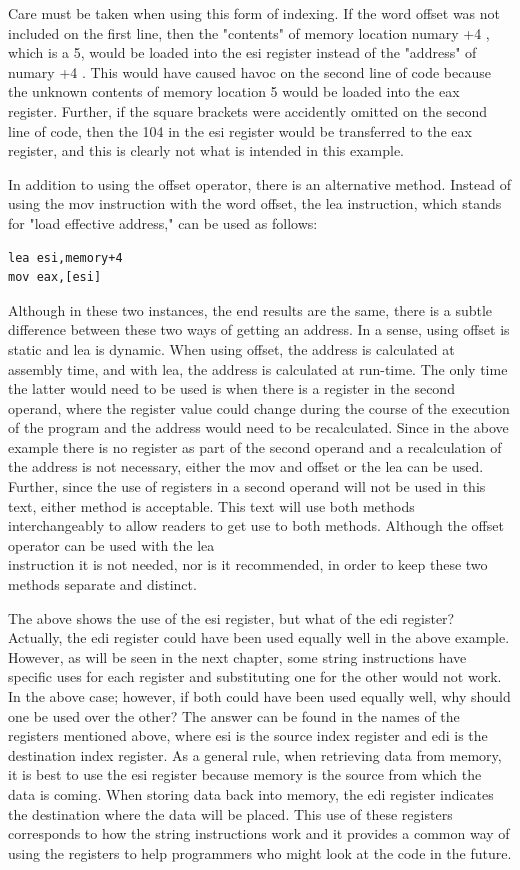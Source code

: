 \documentclass[10pt]{book}
\begin{document}
Care must be taken when using this form of indexing. If the word offset was not included on the first line, then the "contents" of memory location numary +4 , which is a 5, would be loaded into the esi register instead of the "address" of numary +4 . This would have caused havoc on the second line of code because the unknown contents of memory location 5 would be loaded into the eax register. Further, if the square brackets were accidently omitted on the second line of code, then the 104 in the esi register would be transferred to the eax register, and this is clearly not what is intended in this example.

In addition to using the offset operator, there is an alternative method. Instead of using the mov instruction with the word offset, the lea instruction, which stands for "load effective address," can be used as follows:

\begin{verbatim}
lea esi,memory+4
mov eax,[esi]
\end{verbatim}

Although in these two instances, the end results are the same, there is a subtle difference between these two ways of getting an address. In a sense, using offset is static and lea is dynamic. When using offset, the address is calculated at assembly time, and with lea, the address is calculated at run-time. The only time the latter would need to be used is when there is a register in the second operand, where the register value could change during the course of the execution of the program and the address would need to be recalculated. Since in the above example there is no register as part of the second operand and a recalculation of the address is not necessary, either the mov and offset or the lea can be used. Further, since the use of registers in a second operand will not be used in this text, either method is acceptable. This text will use both methods interchangeably to allow readers to get use to both methods. Although the offset operator can be used with the lea\\
instruction it is not needed, nor is it recommended, in order to keep these two methods separate and distinct.

The above shows the use of the esi register, but what of the edi register? Actually, the edi register could have been used equally well in the above example. However, as will be seen in the next chapter, some string instructions have specific uses for each register and substituting one for the other would not work. In the above case; however, if both could have been used equally well, why should one be used over the other? The answer can be found in the names of the registers mentioned above, where esi is the source index register and edi is the destination index register. As a general rule, when retrieving data from memory, it is best to use the esi register because memory is the source from which the data is coming. When storing data back into memory, the edi register indicates the destination where the data will be placed. This use of these registers corresponds to how the string instructions work and it provides a common way of using the registers to help programmers who might look at the code in the future.
\end{document}
